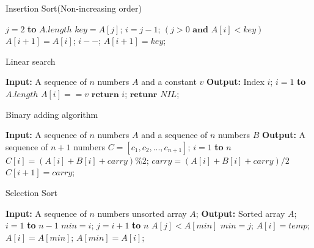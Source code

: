 \documentclass[review, authoryear, 3p, 12pt]{elsarticle}
\begin{document}
	\begin{algorithm}[htbp]
		\caption{Insertion Sort(Non-increasing order)}
		\begin{codebox}
			\li 	\For $j=2$ \textbf{to} $A.length$
			\Do
			\li 		$key = A[j]$;
			\li 		$i = j-1$;
			\li 		\While $(j>0 \textbf{ and } A[i] < key)$
			\Do
			\li				$A[i+1]=A[i]$;
			\li 			$i--$; 
			\End
			\li		$A[i+1]=key$;
		\end{codebox}
	\end{algorithm}
	
	\begin{algorithm}[htbp]
		\caption{Linear search}
		\begin{codebox}
			\zi		\textbf{Input:} A sequence of $n$ numbers $A$ and a constant $v$
			\zi 	\textbf{Output:} Index $i$;
			\li 	\For $i=1$ \textbf{to} $A.length$
			\Do
			\li 		\If $A[i] == v$ 
			\Then
			\li				$\textbf{return } i$;
			\End
			\End
			\li		$\textbf{retunr } NIL$;
		\end{codebox}
	\end{algorithm}
	
	\begin{algorithm}[htbp]
		\caption{Binary adding algorithm}
		\begin{codebox}
			\zi		\textbf{Input:} A sequence of $n$ numbers $A$ and a sequence of $n$ numbers $B$
			\zi 	\textbf{Output:} A sequence of $n+1$ numbers $C = [c_1, c_2, . . . , c_{n+1}]$;
			\li 	\For $i=1$ \textbf{to} $n$
			\Do
			\li 		$C[i]=(A[i]+B[i]+carry)\%2$;
			\li 		$carry=(A[i]+B[i]+carry)/2$
			\End
			\li		$C[i+1]=carry$;
		\end{codebox}
	\end{algorithm}
	
	\begin{algorithm}[htbp]
		\caption{Selection Sort}
		\begin{codebox}
			\zi		\textbf{Input:} A sequence of $n$ numbers unsorted array $A$;
			\zi 	\textbf{Output:} Sorted array $A$;
			\li 	\For $i=1$ \textbf{to} $n-1$
			\Do
			\li 		$min = i$;
			\li 		\For $j=i+1$ \textbf{to} $n$
			\Do
			\li 			\If $A[j] < A[min]$
			\Then
			\li 				$min = j$;
			\End
			\End
			\li			$A[i]=temp$;
			\li 		$A[i]=A[min]$;
			\li 		$A[min]=A[i]$;
			\End
		\end{codebox}
	\end{algorithm}
	
\end{document}
